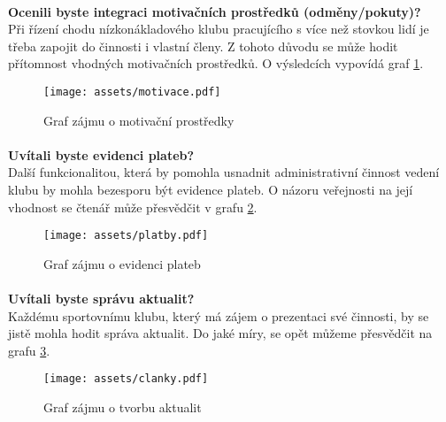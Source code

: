 \documentclass[11pt,oneside]{fithesis}
\begin{document}
                \paragraph*{}
                \noindent
                \textbf{Ocenili byste integraci motivačních prostředků (odměny/pokuty)?}\\
                Při řízení chodu nízkonákladového klubu pracujícího s více než stovkou lidí je třeba zapojit do činnosti i vlastní členy. Z tohoto důvodu se může hodit přítomnost vhodných motivačních prostředků. O výsledcích vypovídá graf \ref{anal-motivace}.\\
                \begin{figure}
                \centering
                \mbox{\texttt{[image: assets/motivace.pdf]}}
                \caption{Graf zájmu o motivační prostředky \label{anal-motivace}}
                \end{figure}

                \paragraph*{}
                \noindent
                \textbf{Uvítali byste evidenci plateb?}\\
                Další funkcionalitou, která by pomohla usnadnit administrativní činnost vedení klubu by mohla bezesporu být evidence plateb. O názoru veřejnosti na její vhodnost se čtenář může přesvědčit v grafu \ref{anal-platby}.\\
                \begin{figure}
                \centering
                \mbox{\texttt{[image: assets/platby.pdf]}}
                \caption{Graf zájmu o evidenci plateb \label{anal-platby}}
                \end{figure}

                \paragraph*{}
                \noindent
                \textbf{Uvítali byste správu aktualit?}\\
                Každému sportovnímu klubu, který má zájem o prezentaci své činnosti, by se jistě mohla hodit správa aktualit. Do jaké míry, se opět můžeme přesvědčit na grafu \ref{anal-clanky}.\\
                \begin{figure}
                \centering
                \mbox{\texttt{[image: assets/clanky.pdf]}}
                \caption{Graf zájmu o tvorbu aktualit \label{anal-clanky}}
                \end{figure}
\end{document}
